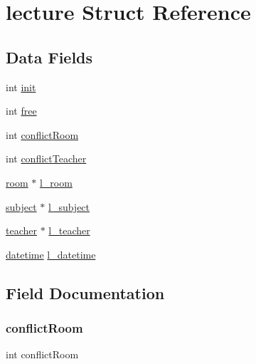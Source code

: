 \hypertarget{structlecture}{}\section{lecture Struct Reference}
\label{structlecture}
\subsection*{Data Fields}
\begin{DoxyCompactItemize}
\item 
int \hyperlink{structlecture_a795ea50921b36311ffd5e7baa2ef1f7e}{init}
\item 
int \hyperlink{structlecture_a4573817871ec032055c7d539617626fe}{free}
\item 
int \hyperlink{structlecture_a3ae883675cb032bec1040a71a363631d}{conflict\+Room}
\item 
int \hyperlink{structlecture_a5459cfc525141e5592d505c28d625d96}{conflict\+Teacher}
\item 
\hyperlink{structroom}{room} $\ast$ \hyperlink{structlecture_ac9357ac63b26ca97ed45bca4e1b7134c}{l\+\_\+room}
\item 
\hyperlink{structsubject}{subject} $\ast$ \hyperlink{structlecture_a104b8fe6246b0cdbadf51b2c4b718002}{l\+\_\+subject}
\item 
\hyperlink{structteacher}{teacher} $\ast$ \hyperlink{structlecture_a4299a0a67212d8dd0ed38c7fc5a9d3eb}{l\+\_\+teacher}
\item 
\hyperlink{structdatetime}{datetime} \hyperlink{structlecture_a31d3e72684a3e6f8c76c85a468468efa}{l\+\_\+datetime}
\end{DoxyCompactItemize}


\subsection{Field Documentation}
\hypertarget{structlecture_a3ae883675cb032bec1040a71a363631d}{}\label{structlecture_a3ae883675cb032bec1040a71a363631d} 
\subsubsection{\texorpdfstring{conflict\+Room}{conflictRoom}}
{\footnotesize\ttfamily int conflict\+Room}

\hypertarget{structlecture_a5459cfc525141e5592d505c28d625d96}{}\label{structlecture_a5459cfc525141e5592d505c28d625d96} 
